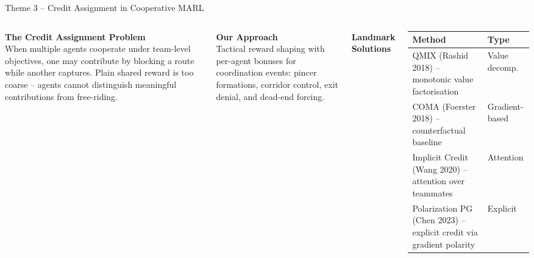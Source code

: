 \documentclass[aspectratio=169,11pt]{beamer}
\begin{document}
\begin{frame}{Theme 3 -- Credit Assignment in Cooperative MARL}
\begin{columns}[T]
\textbf{The Credit Assignment Problem}\\
When multiple agents cooperate under team-level objectives, one may contribute by blocking a route while another captures. Plain shared reward is too coarse -- agents cannot distinguish meaningful contributions from free-riding.

\vspace{6pt}
\textbf{Our Approach}\\
Tactical reward shaping with per-agent bonuses for coordination events: pincer formations, corridor control, exit denial, and dead-end forcing.

\textbf{Landmark Solutions}

\begin{tabular}{@{}p{4.5cm}p{2cm}@{}}
\toprule
\textbf{Method} & \textbf{Type} \\
\midrule
QMIX (Rashid 2018) -- monotonic value factorisation & Value decomp. \\
COMA (Foerster 2018) -- counterfactual baseline & Gradient-based \\
Implicit Credit (Wang 2020) -- attention over teammates & Attention \\
Polarization PG (Chen 2023) -- explicit credit via gradient polarity & Explicit \\
\bottomrule
\end{tabular}
\end{columns}
\end{frame}
\end{document}
